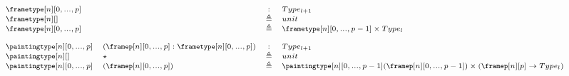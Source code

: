 \documentclass{msc}
\newcommand{\defeq}{\ensuremath{\triangleq}}
\begin{document}
\begin{equation*}
  \fontsize{7.2}{9}\selectfont
  \begin{array}{llcl}
    \frametype[n][0,...,p]    &                                              & :      & Type_{l+1}                                                                                   \\
    \frametype[n][]           &                                              & \defeq & unit                                                                                         \\
    \frametype[n][0,...,p]    &                                              & \defeq & \frametype[n][0,...,p-1] \times Type_l                                                       \\
    \\
    \paintingtype[n][0,...,p] & (\framep[n][0,...,p]:\frametype[n][0,...,p]) & :      & Type_{l+1}                                                                                   \\
    \paintingtype[n][]        & \star                                        & \defeq & unit                                                                                         \\
    \paintingtype[n][0,...,p] & (\framep[n][0,...,p])                        & \defeq & \paintingtype[n][0,...,p-1](\framep[n][0,...,p-1]) \times (\framep[n][p] \rightarrow Type_l) \\
  \end{array}
\end{equation*}
\end{document}
